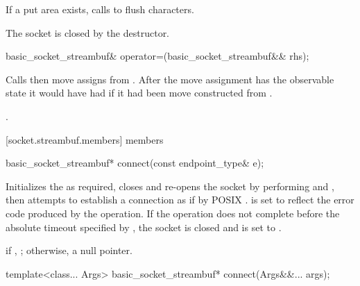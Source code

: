 \begin{itemdescr}
\pnum
\effects If a put area exists, calls  to flush characters. \begin{note} The socket is closed by the  destructor. \end{note}
\end{itemdescr}

\begin{itemdecl}
basic_socket_streambuf& operator=(basic_socket_streambuf&& rhs);
\end{itemdecl}

\begin{itemdescr}
\pnum
\effects Calls  then move assigns from . After the move assignment  has the observable state it would have had if it had been move constructed from .

\pnum
\returns {}.
\end{itemdescr}



[socket.streambuf.members]{ members}

\begin{itemdecl}
basic_socket_streambuf* connect(const endpoint_type& e);
\end{itemdecl}

\begin{itemdescr}
\pnum
\effects Initializes the  as required, closes and re-opens the socket by performing  and , then attempts to establish a connection as if by POSIX .  is set to reflect the error code produced by the operation. If the operation does not complete before the absolute timeout specified by , the socket is closed and  is set to .

\pnum
\returns if , ; otherwise, a null pointer.
\end{itemdescr}

\begin{itemdecl}
template<class... Args>
  basic_socket_streambuf* connect(Args&&... args);
\end{itemdecl}

